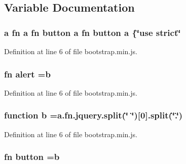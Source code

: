 \subsection{Variable Documentation}
\hypertarget{a00029_ae8f6b400ed3390908c5cdeebed3a82b9}{}
\subsubsection[{a}]{\setlength{\rightskip}{0pt plus 5cm}a {\bf fn} a {\bf fn} {\bf button} a {\bf fn} {\bf button} a \{\char`\"{}use strict\char`\"{}}\label{a00029_ae8f6b400ed3390908c5cdeebed3a82b9}


Definition at line 6 of file bootstrap.\+min.\+js.

\hypertarget{a00029_aaa41eef066735d697e7786ec86d52389}{}
\subsubsection[{alert}]{ {\bf fn} alert ={\bf b}}\label{a00029_aaa41eef066735d697e7786ec86d52389}


Definition at line 6 of file bootstrap.\+min.\+js.

\hypertarget{a00029_ac0431efac4d7c393d1e70b86115cb93f}{}
\subsubsection[{b}]{\setlength{\rightskip}{0pt plus 5cm}function b =a.\+fn.\+jquery.\+split(\char`\"{} \char`\"{})\mbox{[}0\mbox{]}.split(\char`\"{}.\char`\"{})}\label{a00029_ac0431efac4d7c393d1e70b86115cb93f}


Definition at line 6 of file bootstrap.\+min.\+js.

\hypertarget{a00029_a55e170814e74f6c3db8ae9ea3ba9054f}{}
\subsubsection[{button}]{ {\bf fn} button ={\bf b}}\label{a00029_a55e170814e74f6c3db8ae9ea3ba9054f}



